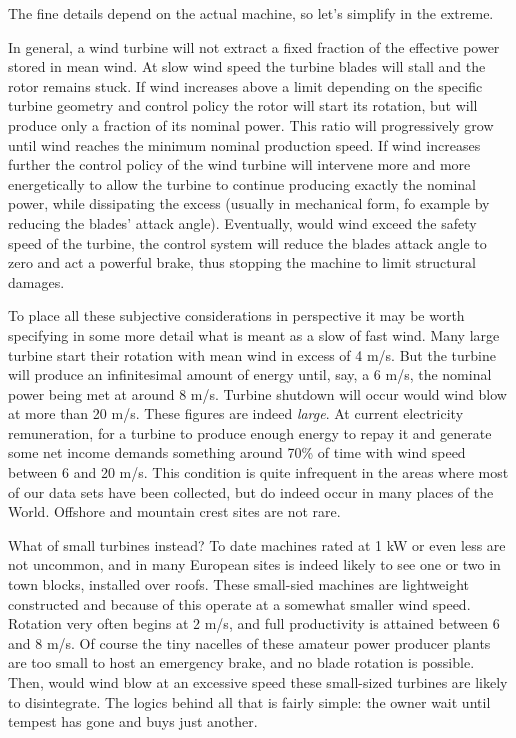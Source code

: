 \documentclass[a4paper,10pt]{book}
\begin{document}
The fine details depend on the actual machine, so let's simplify in the extreme.

In general, a wind turbine will not extract a fixed fraction of the effective power stored in mean wind. At slow wind speed the turbine blades will stall and the rotor remains stuck. If wind increases above a limit depending on the specific turbine geometry and control policy the rotor will start its rotation, but will produce only a fraction of its nominal power. This ratio will progressively grow until wind reaches the minimum nominal production speed. If wind increases further the control policy of the wind turbine will intervene more and more energetically to allow the turbine to continue producing exactly the nominal power, while dissipating the excess (usually in mechanical form, fo example by reducing the blades' attack angle). Eventually, would wind exceed the safety speed of the turbine, the control system will reduce the blades attack angle to zero and act a powerful brake, thus stopping the machine to limit structural damages.

To place all these subjective considerations in perspective it may be worth specifying in some more detail what is meant as a slow of fast wind. Many large turbine start their rotation with mean wind in excess of 4 m/s. But the turbine will produce an infinitesimal amount of energy until, say, a 6 m/s, the nominal power being met at around 8 m/s. Turbine shutdown will occur would wind blow at more than 20 m/s. These figures are indeed \emph{large}. At current electricity remuneration, for a turbine to produce enough energy to repay it and generate some net income demands something around 70\% of time with wind speed between 6 and 20 m/s. This condition is quite infrequent in the areas where most of our data sets have been collected, but do indeed occur in many places of the World. Offshore and mountain crest sites are not rare.

What of small turbines instead? To date machines rated at 1 kW or even less are not uncommon, and in many European sites is indeed likely to see one or two in town blocks, installed over roofs. These small-sied machines are lightweight constructed and because of this operate at a somewhat smaller wind speed. Rotation very often begins at 2 m/s, and full productivity is attained between 6 and 8 m/s. Of course the tiny nacelles of these amateur power producer plants are too small to host an emergency brake, and no blade rotation is possible. Then, would wind blow at an excessive speed these small-sized turbines are likely to disintegrate. The logics behind all that is fairly simple: the owner wait until tempest has gone and buys just another.
\end{document}
